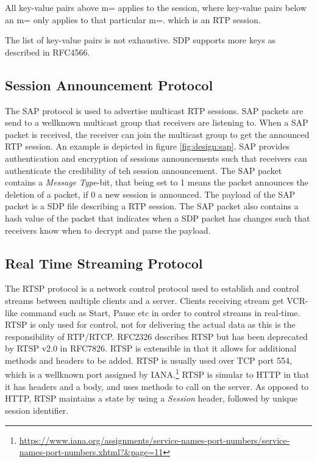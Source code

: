 All key-value pairs above m= applies to the session, where key-value pairs below an m= only applies to that particular m=. which is an RTP session.

The list of key-value pairs is not exhaustive. SDP supports more keys as described in RFC4566.


\subsection{Session Announcement Protocol} \label{sec:design:sap}
The \ac{SAP} protocol is used to advertise multicast RTP sessions. SAP packets are send to a wellknown multicast group that receivers are listening to. When a SAP packet is received, the receiver can join the multicast group to get the announced RTP session. An example is depicted in figure \ref{fig:design:sap}. SAP provides authentication and encryption of sessions announcements such that receivers can authenticate the credibility of teh session announcement. The SAP packet contains a \textit{Message Type}-bit, that being set to 1 means the packet announces the deletion of a packet, if 0 a new session is announced. The payload of the SAP packet is a SDP file describing a RTP session. The SAP packet also contains a hash value of the packet that indicates when a SDP packet has changes such that receivers know when to decrypt and parse the payload. \citep{RFC2974}


\subsection{Real Time Streaming Protocol} \label{sec:design:rtsp}
The RTSP protocol is a network control protocol used to establish and control streams between multiple clients and a server. Clients receiving stream get \ac{VCR}-like command such as Start, Pause etc in order to control streams in real-time. RTSP is only used for control, not for delivering the actual data as this is the responsibility of RTP/RTCP.
RFC2326 describes RTSP but has been deprecated by RTSP v2.0 in RFC7826. RTSP is extensible in that it allows for additional methods and headers to be added.
RTSP is usually used over TCP port 554, which is a wellknown port assigned by IANA.\footnote{\url{https://www.iana.org/assignments/service-names-port-numbers/service-names-port-numbers.xhtml?&page=11}} RTSP is simular to HTTP in that it has headers and a body, and uses methods to call on the server. As opposed to HTTP, RTSP maintains a state by using a \textit{Session} header, followed by unique session identifier.


